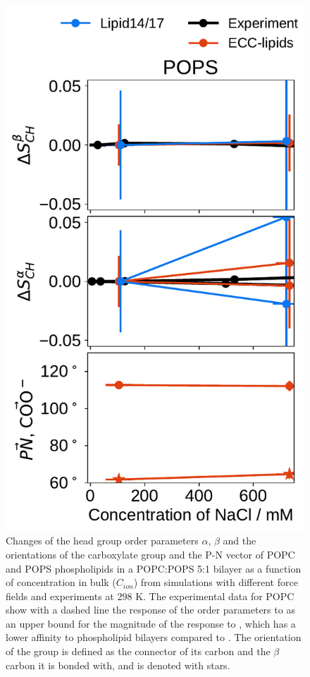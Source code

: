 \begin{figure}[tbp!]
  \includegraphics[width=\figwidthsmall]{../img/ecc_pops/order_parameters_changes_ecc-lip_L14_A-B-PN-COO_POPS_nacl.pdf} 
  \caption{\label{fig:delta_ordPar_NaCl} 
    Changes of the head group order parameters $\alpha$, $\beta$ and the orientations of the carboxylate group and the P-N vector  
    of POPC and POPS phospholipids in a POPC:POPS 5:1 bilayer as a function of  concentration 
    in bulk ($C_{ion}$) from simulations with different force fields and experiments at 298 K. \citep{roux90}
    The experimental data for POPC show with a dashed line the response of the order parameters to  
    as an upper bound for the magnitude of the response to , 
    which has a lower affinity to phospholipid bilayers compared to . 
    The orientation of the  group is defined as the connector of its carbon and the $\beta$ carbon it is bonded with, and is denoted with stars. 
  } 
\end{figure} 



